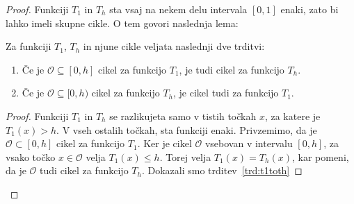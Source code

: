 \documentclass[mat2]{fmfdelo}
\begin{document}
\begin{proof}
Funkciji $T_1$ in $T_h$ sta vsaj na nekem delu intervala $[0, 1]$ enaki, zato bi lahko imeli skupne cikle. O tem govori naslednja lema:
\begin{lema}
Za funkciji $T_1$, $T_h$ in njune cikle  veljata naslednji dve trditvi:
\begin{enumerate}
\item Če je $\mathcal{O} \subseteq [0, h]$ cikel za funkcijo $T_1$, je tudi cikel za funkcijo $T_h$. \label{trd:t1toth}
\item Če je $\mathcal{O} \subseteq [0, h)$ cikel za funkcijo $T_h$, je cikel tudi za funkcijo $T_1$. \label{trd:thtot1}
\end{enumerate}
\end{lema}
\begin{proof}
Funkciji $T_1$ in $T_h$ se razlikujeta samo v tistih točkah $x$, za katere je $T_1(x) > h$. V vseh ostalih točkah, sta funkciji enaki. Privzemimo, da je $\mathcal{O} \subset [0, h]$ cikel za funkcijo $T_1$. Ker je cikel $\mathcal{O}$ vsebovan v intervalu $[0, h]$, za vsako točko $x \in \mathcal{O}$ velja $T_1(x) \leq h$. Torej velja $T_1(x)=T_h(x)$, kar pomeni, da je $\mathcal{O}$ tudi cikel za funkcijo $T_h$. Dokazali smo trditev~\ref{trd:t1toth}


\end{proof}
\end{proof}
\end{document}
